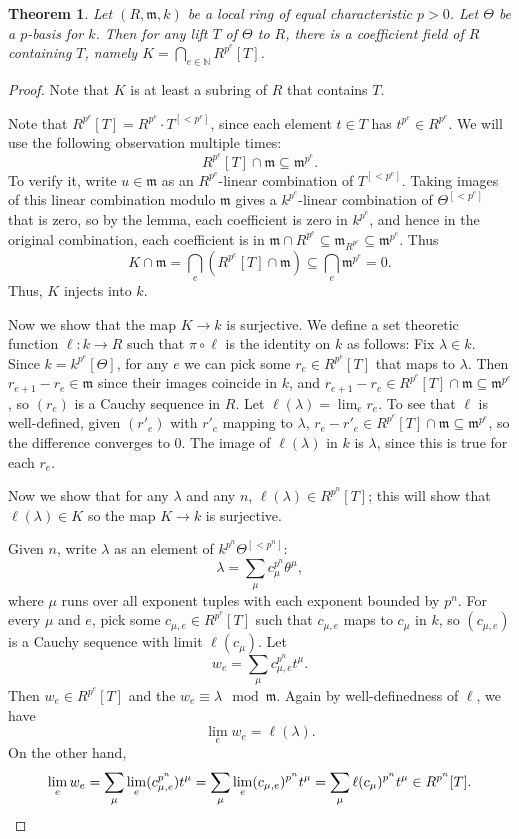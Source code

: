 \documentclass{amsart}[12pt]
\newcommand{\N}{\mathbb{N}}
\newcommand{\fm}{{\mathfrak m}}
\numberwithin{equation}{section}
\theoremstyle{plain} %
\newtheorem{thm}[equation]{Theorem}
\theoremstyle{definition}
\theoremstyle{remark}
\begin{document}
\begin{thm} Let $(R,\fm,k)$ be a local ring of equal characteristic $p>0$. Let $\Theta$ be a $p$-basis for $k$. Then for any lift $T$ of $\Theta$ to $R$, there is a coefficient field of $R$ containing $T$, namely $K= \bigcap_{e\in \N} R^{p^e}[T]$.
\end{thm}
\begin{proof} Note that $K$ is at least a subring of $R$ that contains $T$. 

Note that $R^{p^e}[T] = R^{p^e} \cdot T^{[<p^e]}$, since each element $t\in T$ has $t^{p^e}\in R^{p^e}$. We will use the following observation multiple times:
\begin{equation}\tag{$\clubsuit$} R^{p^e}[T] \cap \fm \subseteq \fm^{p^e}.\end{equation} To verify it, write $u\in \fm$ as an $R^{p^e}$-linear combination of $T^{[<p^e]}$. Taking images of this linear combination modulo $\fm$ gives a $k^{p^e}$-linear combination of  $\Theta^{[<p^e]}$ that is zero, so by the lemma, each coefficient is zero in $k^{p^e}$, and hence in the original combination, each coefficient is in $\fm \cap R^{p^e} \subseteq \fm_{R^{p^e}} \subseteq \fm^{p^e}$. Thus \[ K \cap \fm = \bigcap_e (R^{p^e}[T] \cap \fm) \subseteq \bigcap_e \fm^{p^e}= 0.\] Thus, $K$ injects into $k$.

Now we show that the map $K\to k$ is surjective. We define a set theoretic function $\ell: k \to R$ such that $\pi \circ \ell$ is the identity on $k$ as follows:
Fix $\lambda\in k$. Since $k=k^{p^e}[\Theta]$, for any $e$ we can pick some $r_e\in R^{p^e}[T]$ that maps to $\lambda$. Then $r_{e+1} - r_e \in \fm$ since their images coincide in $k$, and $r_{e+1}- r_e\in R^{p^e}[T] \cap \fm \subseteq \fm^{p^e}$, so $(r_e)$ is a Cauchy sequence in $R$. Let $\ell(\lambda)=\lim_e r_e$. To see that $\ell$ is well-defined, given $(r'_e)$ with $r'_e$ mapping to $\lambda$, $r_e-r'_e \in R^{p^e}[T]\cap \fm \subseteq \fm^{p^e}$, so the difference converges to $0$. The image of $\ell(\lambda)$ in $k$ is $\lambda$, since this is true for each $r_e$. 

Now we show that for any $\lambda$ and any $n$,  $\ell(\lambda) \in R^{p^n}[T]$; this will show that $\ell(\lambda)\in K$ so the map $K\to k$ is surjective.

Given $n$, write $\lambda$ as an element of $k^{p^n} \Theta^{[<p^n]}$:
\[ \lambda = \sum_\mu c^{p^n}_\mu \theta^{\mu},\]
where $\mu$ runs over all exponent tuples with each exponent bounded by $p^n$.
For every $\mu$ and $e$, pick some $c_{\mu,e}\in R^{p^e}[T]$ such that $c_{\mu,e}$ maps to $c_\mu$ in $k$, so $(c_{\mu,e})$ is a Cauchy sequence with limit $\ell(c_\mu)$. Let 
\[ w_e = \sum_\mu c^{p^n}_{\mu,e} t^{\mu}.\]
Then $w_e\in R^{p^e}[T]$ and the $w_e \equiv \lambda \mod \fm$. Again by well-definedness of $\ell$, we have
\[ \lim_e w_e = \ell(\lambda).\]
On the other hand,
\[ \lim_e w_e = \sum_\mu \lim_e (c^{p^n}_{\mu,e}) t^{\mu} = \sum_\mu \lim_e (c_{\mu,e})^{p^n} t^{\mu} =\sum_\mu \ell(c_\mu)^{p^n} t^{\mu} \in R^{p^n}[T]. \qedhere \]
\end{proof}
\end{document}
